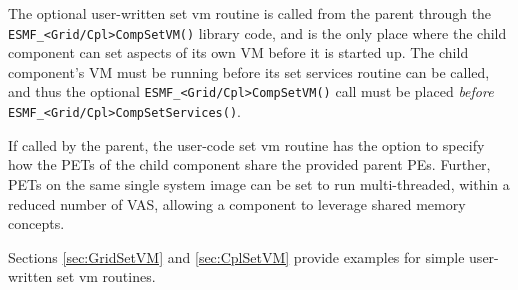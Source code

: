 The optional user-written set vm routine is called from the parent
through the {\tt ESMF\_<Grid/Cpl>CompSetVM()} library code, and is the only
place where the child component can set aspects of its own VM before it is 
started up. The child component's VM must be running before its set services
routine can be called, and thus the optional {\tt ESMF\_<Grid/Cpl>CompSetVM()}
call must be placed {\em before} {\tt ESMF\_<Grid/Cpl>CompSetServices()}.

If called by the parent, the user-code set vm routine has the option to
specify how the PETs of the child component share the provided parent PEs.
Further, PETs on the same single system image can be set to run multi-threaded,
within a reduced number of VAS, allowing a component to leverage shared memory
concepts.

Sections \ref{sec:GridSetVM} and \ref{sec:CplSetVM} provide examples for
simple user-written set vm routines.
